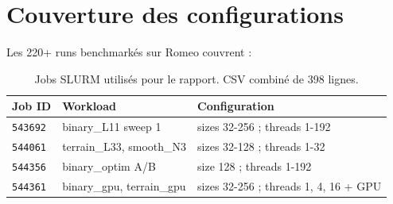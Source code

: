 \section{Couverture des configurations}
\label{sec:proto:coverage}

Les 220+ runs benchmarkés sur Romeo couvrent :

\begin{table}[H]
\centering
\begin{tabularx}{\textwidth}{lXX}
\toprule
\textbf{Job ID} & \textbf{Workload} & \textbf{Configuration} \\
\midrule
\texttt{543692} & binary\_L11 sweep 1 & sizes 32-256 ; threads 1-192 \\
\texttt{544061} & terrain\_L33, smooth\_N3 & sizes 32-128 ; threads 1-32 \\
\texttt{544356} & binary\_optim A/B & size 128 ; threads 1-192 \\
\texttt{544361} & binary\_gpu, terrain\_gpu & sizes 32-256 ; threads 1, 4, 16 + GPU \\
\bottomrule
\end{tabularx}
\caption{Jobs SLURM utilisés pour le rapport. CSV combiné de 398 lignes.}
\label{tab:proto:jobs}
\end{table}
